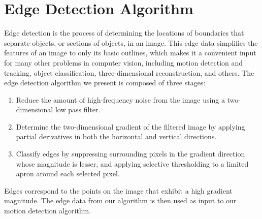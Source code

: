 \documentclass[journal]{IEEEtran}
\begin{document}
\section{Edge Detection Algorithm}
Edge detection is the process of determining the locations of boundaries that separate objects, or sections of objects, in an image. This edge data simplifies the features of an image to only its basic outlines, which makes it a convenient input for many other problems in computer vision, including motion detection and tracking, object classification, three-dimensional reconstruction, and others. The edge detection algorithm we present is composed of three stages:
\begin{enumerate}
	\item Reduce the amount of high-frequency noise from the image using a two-dimensional low pass filter.
	\item Determine the two-dimensional gradient of the filtered image by applying partial derivatives in both the horizontal and vertical directions.
	\item Classify edges by suppressing surrounding pixels in the gradient direction whose magnitude is lesser, and applying selective thresholding to a limited apron around each selected pixel.
\end{enumerate}
Edges correspond to the points on the image that exhibit a high gradient magnitude. The edge data from our algorithm is then used as input to our motion detection algorithm.
\end{document}
